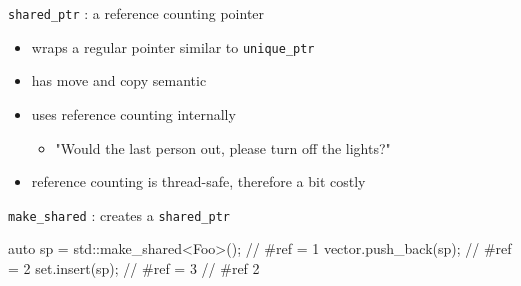 \begin{frame}[fragile]
  \begin{block}{\texttt{shared_ptr} : a reference counting pointer}
    \begin{itemize}
    \item wraps a regular pointer similar to \texttt{unique_ptr}
    \item has move and copy semantic
    \item uses reference counting internally
      \begin{itemize}
      \item "Would the last person out, please turn off the lights?"
      \end{itemize}
    \item reference counting is thread-safe, therefore a bit costly
    \end{itemize}
  \end{block}
  \begin{block}{\texttt{make\_shared} : creates a \texttt{shared\_ptr}}
    \begin{cppcode*}{}
      {
        auto sp = std::make_shared<Foo>(); // #ref = 1
        vector.push_back(sp);              // #ref = 2
        set.insert(sp);                    // #ref = 3
      } // #ref 2
    \end{cppcode*}
  \end{block}
\end{frame}

